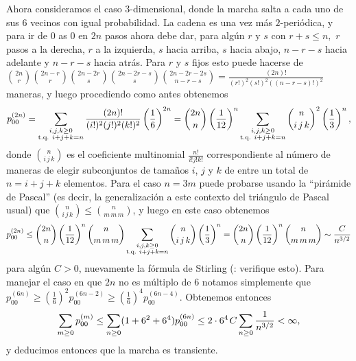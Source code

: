 \begin{ex}\label{ex:srw-3-a}
Ahora consideramos el caso $3$-dimensional, donde la marcha salta a cada uno de sus 6 vecinos con igual probabilidad.
La cadena es una vez más $2$-periódica, y para ir de $0$ as $0$ en $2n$ pasos ahora debe dar, para algún $r$ y $s$ con $r+s\leq n,$ $r$ pasos a la derecha, $r$ a la izquierda, $s$ hacia arriba, $s$ hacia abajo, $n-r-s$ hacia adelante y $n-r-s$ hacia atrás.
Para $r$ y $s$ fijos esto puede hacerse de $\binom{2n}{r}\binom{2n-r}{r}\binom{2n-2r}{s}\binom{2n-2r-s}{s}\binom{2n-2r-2s}{n-r-s}=\frac{(2n)!}{(r!)^2(s!)^2((n-r-s)!)^2}$ maneras, y luego procediendo como antes obtenemos
\begin{equation}\label{eq:srw-3-a1}
p^{(2n)}_{00}=\sum_{\substack{i,j,k\geq0\\\text{\upshape{t.q. }}i+j+k=n}}\frac{(2n)!}{(i!)^2(j!)^2(k!)^2}\left(\frac16\right)^{2n}
=\binom{2n}{n}\left(\frac1{12}\right)^{n}\sum_{\substack{i,j,k\geq0\\\text{\upshape{t.q. }}i+j+k=n}}\binom{n}{i\,j\,k}^2\left(\frac13\right)^{n},
\end{equation}
donde $\binom{n}{i\,j\,k}$ es el coeficiente multinomial $\frac{n!}{i!j!k!}$ correspondiente al número de maneras de elegir subconjuntos de tamaños $i$, $j$ y $k$ de entre un total de $n=i+j+k$ elementos.
Para el caso $n=3m$ puede probarse usando la ``pirámide de Pascal'' (es decir, la generalización a este contexto del triángulo de Pascal usual) que $\binom{n}{i\,j\,k}\leq\binom{n}{m\,m\,m}$, y luego en este caso obtenemos
\[p^{(2n)}_{00}\leq\binom{2n}{n}\left(\frac1{12}\right)^{n}\binom{n}{m\,m\,m}\sum_{\substack{i,j,k\geq0\\\text{\upshape{t.q. }}i+j+k=n}}\binom{n}{i\,j\,k}\left(\frac13\right)^{n}=\binom{2n}{n}\left(\frac1{12}\right)^{n}\binom{n}{m\,m\,m}\sim\frac{C}{n^{3/2}}\]
para algún $C>0$, nuevamente la fórmula de Stirling (\uexers: verifique esto).
Para manejar el caso en que $2n$ no es múltiplo de $6$ notamos simplemente que $p^{(6n)}_{00}\geq(\frac16)^2p^{(6n-2)}_{00}\geq(\frac16)^4p^{(6n-4)}_{00}$.
Obtenemos entonces
\[\sum_{m\geq0}p^{(m)}_{00}\leq\sum_{n\geq0}(1+6^2+6^4)p^{(6n)}_{00}\leq2\cdot6^4\hspace{0.1em} C\sum_{n\geq0}\frac1{n^{3/2}}<\infty,\]
y deducimos entonces que la marcha es transiente.
\end{ex}

